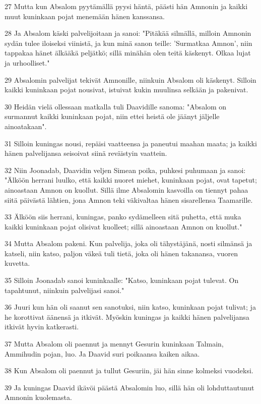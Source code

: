 \par 27 Mutta kun Absalom pyytämällä pyysi häntä, päästi hän Amnonin ja kaikki muut kuninkaan pojat menemään hänen kanssansa.
\par 28 Ja Absalom käski palvelijoitaan ja sanoi: "Pitäkää silmällä, milloin Amnonin sydän tulee iloiseksi viinistä, ja kun minä sanon teille: 'Surmatkaa Amnon', niin tappakaa hänet älkääkä peljätkö; sillä minähän olen teitä käskenyt. Olkaa lujat ja urhoolliset."
\par 29 Absalomin palvelijat tekivät Amnonille, niinkuin Absalom oli käskenyt. Silloin kaikki kuninkaan pojat nousivat, istuivat kukin muulinsa selkään ja pakenivat.
\par 30 Heidän vielä ollessaan matkalla tuli Daavidille sanoma: "Absalom on surmannut kaikki kuninkaan pojat, niin ettei heistä ole jäänyt jäljelle ainoatakaan".
\par 31 Silloin kuningas nousi, repäisi vaatteensa ja paneutui maahan maata; ja kaikki hänen palvelijansa seisoivat siinä reväistyin vaattein.
\par 32 Niin Joonadab, Daavidin veljen Simean poika, puhkesi puhumaan ja sanoi: "Älköön herrani luulko, että kaikki nuoret miehet, kuninkaan pojat, ovat tapetut; ainoastaan Amnon on kuollut. Sillä ilme Absalomin kasvoilla on tiennyt pahaa siitä päivästä lähtien, jona Amnon teki väkivaltaa hänen sisarellensa Taamarille.
\par 33 Älköön siis herrani, kuningas, panko sydämelleen sitä puhetta, että muka kaikki kuninkaan pojat olisivat kuolleet; sillä ainoastaan Amnon on kuollut."
\par 34 Mutta Absalom pakeni. Kun palvelija, joka oli tähystäjänä, nosti silmänsä ja katseli, niin katso, paljon väkeä tuli tietä, joka oli hänen takanansa, vuoren kuvetta.
\par 35 Silloin Joonadab sanoi kuninkaalle: "Katso, kuninkaan pojat tulevat. On tapahtunut, niinkuin palvelijasi sanoi."
\par 36 Juuri kun hän oli saanut sen sanotuksi, niin katso, kuninkaan pojat tulivat; ja he korottivat äänensä ja itkivät. Myöskin kuningas ja kaikki hänen palvelijansa itkivät hyvin katkerasti.
\par 37 Mutta Absalom oli paennut ja mennyt Gesurin kuninkaan Talmain, Ammihudin pojan, luo. Ja Daavid suri poikaansa kaiken aikaa.
\par 38 Kun Absalom oli paennut ja tullut Gesuriin, jäi hän sinne kolmeksi vuodeksi.
\par 39 Ja kuningas Daavid ikävöi päästä Absalomin luo, sillä hän oli lohduttautunut Amnonin kuolemasta.

